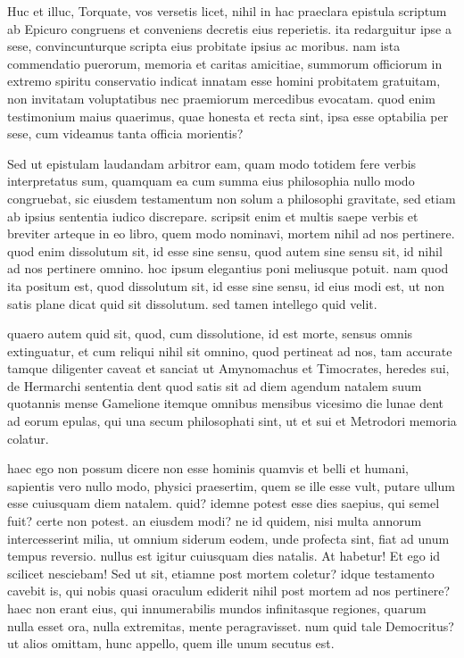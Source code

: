  Huc et illuc, Torquate, vos versetis licet, nihil in hac praeclara epistula scriptum ab Epicuro congruens et conveniens decretis eius reperietis. ita redarguitur ipse a sese, convincunturque scripta eius probitate ipsius ac moribus. nam ista commendatio puerorum, memoria et caritas amicitiae, summorum officiorum in extremo spiritu conservatio indicat innatam esse homini probitatem gratuitam, non invitatam voluptatibus nec praemiorum mercedibus evocatam. quod enim testimonium maius quaerimus, quae honesta et recta sint, ipsa esse optabilia per sese, cum videamus tanta officia morientis?

 Sed ut epistulam laudandam arbitror eam, quam modo totidem fere verbis interpretatus sum, quamquam ea cum summa eius philosophia nullo modo congruebat, sic eiusdem testamentum non solum a philosophi gravitate, sed etiam ab ipsius sententia iudico discrepare. scripsit enim et multis saepe verbis et breviter arteque in eo libro, quem modo nominavi, mortem nihil ad nos pertinere. quod enim dissolutum sit, id esse sine sensu, quod autem sine sensu sit, id nihil ad nos pertinere omnino. hoc ipsum elegantius poni meliusque potuit. nam quod ita positum est, quod dissolutum sit, id esse sine sensu, id eius modi est, ut non satis plane dicat quid sit dissolutum. sed tamen intellego quid velit.

 quaero autem quid sit, quod, cum dissolutione, id est morte, sensus omnis extinguatur, et cum reliqui nihil sit omnino, quod pertineat ad nos, tam accurate tamque diligenter caveat et sanciat ut Amynomachus et Timocrates, heredes sui, de Hermarchi sententia dent quod satis sit ad diem agendum natalem suum quotannis mense Gamelione itemque omnibus mensibus vicesimo die lunae dent ad eorum epulas, qui una secum philosophati sint, ut et sui et Metrodori memoria colatur.

 haec ego non possum dicere non esse hominis quamvis et belli et humani, sapientis vero nullo modo, physici praesertim, quem se ille esse vult, putare ullum esse cuiusquam diem natalem. quid? idemne potest esse dies saepius, qui semel fuit? certe non potest. an eiusdem modi? ne id quidem, nisi multa annorum intercesserint milia, ut omnium siderum eodem, unde profecta sint, fiat ad unum tempus reversio. nullus est igitur cuiusquam dies natalis. At habetur! Et ego id scilicet nesciebam! Sed ut sit, etiamne post mortem coletur? idque testamento cavebit is, qui nobis quasi oraculum ediderit nihil post mortem ad nos pertinere? haec non erant eius, qui innumerabilis mundos infinitasque regiones, quarum nulla esset ora, nulla extremitas, mente peragravisset. num quid tale Democritus? ut alios omittam, hunc appello, quem ille unum secutus est.

